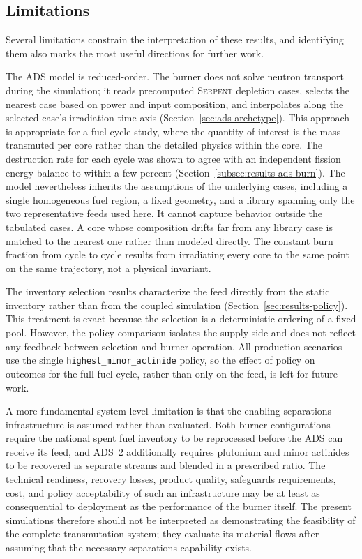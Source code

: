\subsection{Limitations}
\label{subsec:discussion-limitations}

Several limitations constrain the interpretation of these results, and identifying
them also marks the most useful directions for further work.

The \gls{ADS} model is reduced-order. The burner does not solve neutron transport
during the simulation; it reads precomputed \textsc{Serpent} depletion cases,
selects the nearest case based on power and input composition, and interpolates
along the selected case's irradiation time axis
(Section~\ref{sec:ads-archetype}). This approach is appropriate for a fuel cycle
study, where the quantity of interest is the mass transmuted per core rather than
the detailed physics within the core. The destruction rate for each cycle was
shown to agree with an independent fission energy balance to within a few percent
(Section~\ref{subsec:results-ads-burn}). The model nevertheless inherits the
assumptions of the underlying cases, including a single homogeneous fuel region,
a fixed geometry, and a library spanning only the two representative feeds used
here. It cannot capture behavior outside the tabulated cases. A core whose
composition drifts far from any library case is matched to the nearest one rather
than modeled directly. The constant burn fraction from cycle to cycle results
from irradiating every core to the same point on the same trajectory, not a physical invariant.

The inventory selection results characterize the feed directly from the static
inventory rather than from the coupled simulation
(Section~\ref{sec:results-policy}). This treatment is exact because the selection
is a deterministic ordering of a fixed pool. However, the policy comparison
isolates the supply side and does not reflect any feedback between selection and burner
operation. All production scenarios use the single \texttt{highest\_minor\_actinide}
policy, so the effect of policy on outcomes for the full fuel cycle, rather than
only on the feed, is left for future work.

A more fundamental system level limitation is that the enabling separations
infrastructure is assumed rather than evaluated. Both burner configurations
require the national spent fuel inventory to be reprocessed before the ADS can
receive its feed, and ADS~2 additionally requires plutonium and minor actinides
to be recovered as separate streams and blended in a prescribed ratio. The
technical readiness, recovery losses, product quality, safeguards requirements,
cost, and policy acceptability of such an infrastructure may be at least as
consequential to deployment as the performance of the burner itself. The
present simulations therefore should not be interpreted as demonstrating the
feasibility of the complete transmutation system; they evaluate its material
flows after assuming that the necessary separations capability exists.

